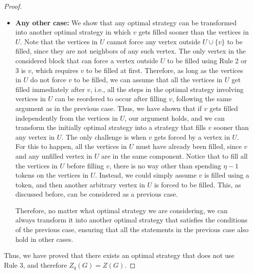 \documentclass[11pt]{article}
\theoremstyle{plain}
\theoremstyle{definition}
\theoremstyle{remark}
\begin{document}
\begin{proof}
\begin{itemize}
   
    \item \textbf{Any other case:} We show that any optimal strategy can be transformed into another optimal strategy in which $v$ gets filled sooner than the vertices in $U$. Note that the vertices in $U$ cannot force any vertex outside $U \cup \{v\}$ to be filled, since they are not neighbors of any such vertex. The only vertex in the considered block that can force a vertex outside $U$ to be filled using Rule 2 or 3 is $v$, which requires $v$ to be filled at first. Therefore, as long as the vertices in $U$ do not force $v$ to be filled, we can assume that all the vertices in $U$ get filled immediately after $v$, i.e., all the steps in the optimal strategy involving vertices in $U$ can be reordered to occur after filling $v$, following the same argument as in the previous case. Thus, we have shown that if $v$ gets filled independently from the vertices in $U$, our argument holds, and we can transform the initially optimal strategy into a strategy that fills $v$ sooner than any vertex in $U$. The only challenge is when $v$ gets forced by a vertex in $U$. For this to happen, all the vertices in $U$ must have already been filled, since $v$ and any unfilled vertex in $U$ are in the same component. Notice that to fill all the vertices in $U$ before filling $v$, there is no way other than spending $\eta - 1$ tokens on the vertices in $U$. Instead, we could simply assume $v$ is filled using a token, and then another arbitrary vertex in $U$ is forced to be filled. This, as discussed before, can be considered as a previous case. 
    
    Therefore, no matter what optimal strategy we are considering, we can always transform it into another optimal strategy that satisfies the conditions of the previous case, ensuring that all the statements in the previous case also hold in other cases.
    
\end{itemize}

Thus, we have proved that there exists an optimal strategy that does not use Rule 3, and therefore $Z_q(G) = Z(G)$.
\end{proof}
\end{document}
